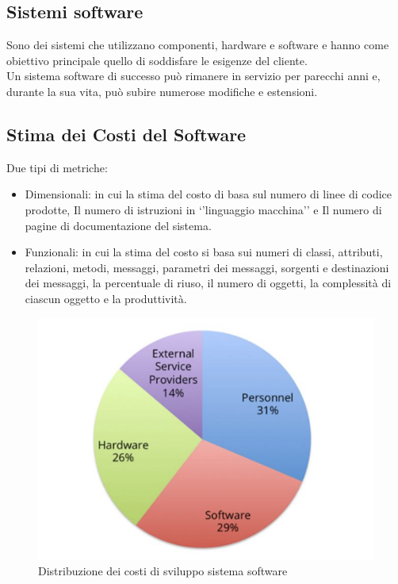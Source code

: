 \documentclass{article}
\begin{document}
	\subsection{Sistemi software}
	Sono dei sistemi che utilizzano componenti, hardware e software e hanno come obiettivo principale quello di soddisfare le esigenze del cliente.\\
	Un sistema software di successo può rimanere in servizio per
	parecchi anni e, durante la sua vita, può subire numerose modifiche e
	estensioni.
	\subsection{Stima dei Costi del Software}
	Due tipi di metriche:
	\begin{itemize}
		\item Dimensionali: in cui la stima del costo di basa sul numero
		di linee di codice prodotte, Il numero di istruzioni in ‘’linguaggio macchina’’
		e Il numero di pagine di documentazione del sistema.
		\item Funzionali: in cui la stima del costo si basa sui numeri di
		classi, attributi, relazioni, metodi, messaggi, parametri dei messaggi,
		sorgenti e destinazioni dei messaggi, la percentuale di riuso, il numero
		di oggetti, la complessità di ciascun oggetto e la produttività.
	\end{itemize}
	\begin{figure}[h]
		\centering
		\includegraphics[scale=0.8]{1.dist_costi.png}
		\caption{Distribuzione dei costi di sviluppo sistema software}
		\label{fig:im-1}
	\end{figure}
\end{document}
